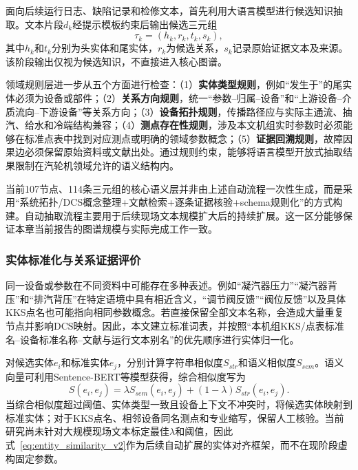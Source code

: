 面向后续运行日志、缺陷记录和检修文本，首先利用大语言模型进行候选知识抽取。文本片段$d_k$经提示模板约束后输出候选三元组
\begin{equation}
\tau_k=(h_k,r_k,t_k,s_k),
\end{equation}
其中$h_k$和$t_k$分别为头实体和尾实体，$r_k$为候选关系，$s_k$记录原始证据文本及来源。该阶段输出仅视为候选知识，不直接进入核心图谱。

领域规则层进一步从五个方面进行检查：（1）\textbf{实体类型规则}，例如“发生于”的尾实体必须为设备或部件；（2）\textbf{关系方向规则}，统一“参数--归属--设备”和“上游设备--介质流向--下游设备”等关系方向；（3）\textbf{设备拓扑规则}，传播路径应与实际主通流、抽汽、给水和冷端结构兼容；（4）\textbf{测点存在性规则}，涉及本文机组实时参数时必须能够在标准点表中找到对应测点或明确的领域参数概念；（5）\textbf{证据回溯规则}，故障因果边必须保留原始资料或文献出处。通过规则约束，能够将语言模型开放式抽取结果限制在汽轮机领域允许的语义结构内。

当前107节点、114条三元组的核心语义层并非由上述自动流程一次性生成，而是采用“系统拓扑/DCS概念整理+文献检索+逐条证据核验+schema规则化”的方式构建。自动抽取流程主要用于后续现场文本规模扩大后的持续扩展。这一区分能够保证本章当前报告的图谱规模与实际完成工作一致。

\subsubsection{实体标准化与关系证据评价}

同一设备或参数在不同资料中可能存在多种表述。例如“凝汽器压力”“凝汽器背压”和“排汽背压”在特定语境中具有相近含义，“调节阀反馈”“阀位反馈”以及具体KKS点名也可能指向相同参数概念。若直接保留全部文本名称，会造成大量重复节点并影响DCS映射。因此，本文建立标准词表，并按照“本机组KKS/点表标准名--设备标准名称--文献与运行文本别名”的优先顺序进行实体归一化。

对候选实体$e_i$和标准实体$e_j$，分别计算字符串相似度$S_{str}$和语义相似度$S_{sem}$。语义向量可利用Sentence-BERT等模型获得\cite{Reimers2019SentenceBERT}，综合相似度写为
\begin{equation}
S(e_i,e_j)=\lambda S_{sem}(e_i,e_j)+(1-\lambda)S_{str}(e_i,e_j).
\label{eq:entity_similarity_v2}
\end{equation}
当综合相似度超过阈值、实体类型一致且设备上下文不冲突时，将候选实体映射到标准实体；对于KKS点名、相邻设备同名测点和专业缩写，保留人工核验。当前研究尚未针对大规模现场文本标定最佳$\lambda$和阈值，因此式~\eqref{eq:entity_similarity_v2}作为后续自动扩展的实体对齐框架，而不在现阶段虚构固定参数。

